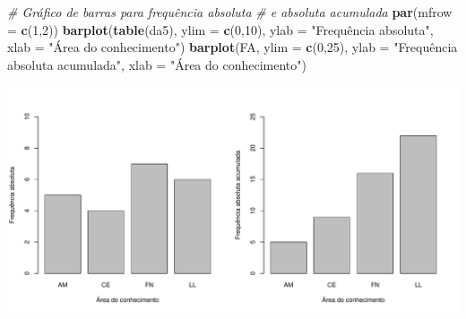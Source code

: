 \documentclass[]{article}
\newenvironment{Shaded}{\begin{snugshade}}{\end{snugshade}}
\newcommand{\KeywordTok}[1]{\textcolor[rgb]{0.13,0.29,0.53}{\textbf{#1}}}
\newcommand{\DataTypeTok}[1]{\textcolor[rgb]{0.13,0.29,0.53}{#1}}
\newcommand{\DecValTok}[1]{\textcolor[rgb]{0.00,0.00,0.81}{#1}}
\newcommand{\StringTok}[1]{\textcolor[rgb]{0.31,0.60,0.02}{#1}}
\newcommand{\CommentTok}[1]{\textcolor[rgb]{0.56,0.35,0.01}{\textit{#1}}}
\newcommand{\NormalTok}[1]{#1}
\begin{document}
\begin{Shaded}
\begin{Highlighting}[]
\CommentTok{# Gráfico de barras para frequência absoluta}
\CommentTok{# e absoluta acumulada}
\KeywordTok{par}\NormalTok{(}\DataTypeTok{mfrow =} \KeywordTok{c}\NormalTok{(}\DecValTok{1}\NormalTok{,}\DecValTok{2}\NormalTok{))}
\KeywordTok{barplot}\NormalTok{(}\KeywordTok{table}\NormalTok{(da5), }
        \DataTypeTok{ylim =} \KeywordTok{c}\NormalTok{(}\DecValTok{0}\NormalTok{,}\DecValTok{10}\NormalTok{), }
        \DataTypeTok{ylab =} \StringTok{"Frequência absoluta"}\NormalTok{, }
        \DataTypeTok{xlab =} \StringTok{"Área do conhecimento"}\NormalTok{)}
\KeywordTok{barplot}\NormalTok{(FA, }\DataTypeTok{ylim =} \KeywordTok{c}\NormalTok{(}\DecValTok{0}\NormalTok{,}\DecValTok{25}\NormalTok{), }
        \DataTypeTok{ylab =} \StringTok{"Frequência absoluta acumulada"}\NormalTok{, }
        \DataTypeTok{xlab =} \StringTok{"Área do conhecimento"}\NormalTok{)}
\end{Highlighting}
\end{Shaded}

\includegraphics{Lista_1_Gabarito_files/figure-latex/unnamed-chunk-9-1.pdf}
\end{document}
